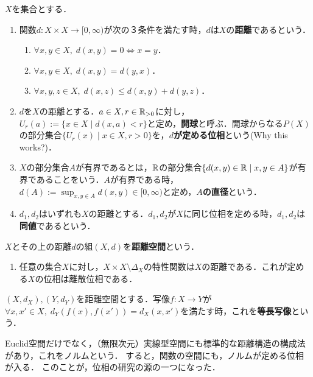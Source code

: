 \documentclass[uplatex,dvipdfmx]{jsreport}
\begin{document}
\begin{definition}
    $X$を集合とする．
    \begin{enumerate}
        \item 関数$d:X\times X\to[0,\infty)$が次の３条件を満たす時，$d$は$X$の\textbf{距離}であるという．
        \begin{enumerate}[(1)]
            \item $\forall x,y\in X,\; d(x,y)=0\Leftrightarrow x=y$．
            \item $\forall x,y\in X,\; d(x,y)=d(y,x)$．
            \item $\forall x,y,z\in X,\; d(x,z)\le d(x,y)+d(y,z)$．
        \end{enumerate}
        \item $d$を$X$の距離とする．$a\in X,r\in\mathbb{R}_{>0}$に対し，$U_r(a):=\{x\in X\mid d(x,a)<r\}$と定め，\textbf{開球}と呼ぶ．開球からなる$P(X)$の部分集合$\{U_r(x)\mid x\in X,r>0\}$を，\textbf{$d$が定める位相}という(Why this works?)．
        \item $X$の部分集合$A$が有界であるとは，$\mathbb{R}$の部分集合$\{d(x,y)\in\mathbb{R}\mid x,y\in A\}$が有界であることをいう．$A$が有界である時，$d(A):=\sup_{x,y\in A}d(x,y)\in [0,\infty)$と定め，\textbf{$A$の直径}という．
        \item $d_1,d_2$はいずれも$X$の距離とする．$d_1,d_2$が$X$に同じ位相を定める時，$d_1,d_2$は\textbf{同値}であるという．
    \end{enumerate}
    $X$とその上の距離$d$の組$(X,d)$を\textbf{距離空間}という．
\end{definition}
\begin{example}\mbox{}
    \begin{enumerate}
        \item 任意の集合$X$に対し，$X\times X\setminus\Delta_X$の特性関数は$X$の距離である．これが定める$X$の位相は離散位相である．
    \end{enumerate}
\end{example}

\begin{definition}
    $(X,d_X),(Y,d_Y)$を距離空間とする．写像$f:X\to Y$が$\forall x,x'\in X,\; d_Y(f(x),f(x'))=d_X(x,x')$を満たす時，これを\textbf{等長写像}という．
\end{definition}

Euclid空間だけでなく，（無限次元）実線型空間にも標準的な距離構造の構成法があり，これをノルムという．
すると，関数の空間にも，ノルムが定める位相が入る．
このことが，位相の研究の源の一つになった．
\end{document}
